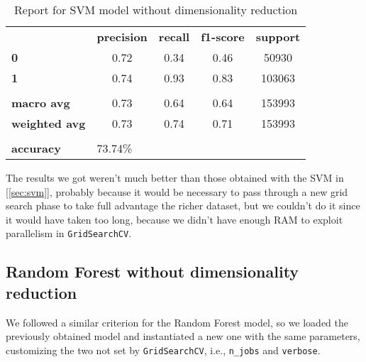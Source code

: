 \begin{table}[h!]
    \centering
    \begin{tabular}{lcccc}
        \rowcolor[HTML]{EEEEEE} 
        \cellcolor[HTML]{FBFBFB} & \textbf{precision} & \textbf{recall} & \textbf{f1-score} & \textbf{support} \\
        \rowcolor[HTML]{EEEEEE} 
        \textbf{0}               & 0.72               & 0.34            & 0.46              & 50930            \\
        \rowcolor[HTML]{EEEEEE} 
        \textbf{1}               & 0.74               & 0.93            & 0.83              & 103063           \\
        \rowcolor[HTML]{FBFBFB} 
        &                    &                 &                   &                  \\
        \rowcolor[HTML]{EEEEEE} 
        \textbf{macro avg}       & 0.73               & 0.64            & 0.64              & 153993           \\
        \rowcolor[HTML]{EEEEEE} 
        \textbf{weighted avg}    & 0.73               & 0.74            & 0.71              & 153993           \\
        \rowcolor[HTML]{FBFBFB} 
        &                    &                 &                   &                  \\
        \rowcolor[HTML]{EEEEEE} 
        \textbf{accuracy}        & \multicolumn{4}{l}{\cellcolor[HTML]{EEEEEE}73.74\%}                         
    \end{tabular}
    \caption{Report for SVM model without dimensionality reduction}
    \label{tab:svm-res-no-dim-red}
\end{table}

The results we got weren't much better than those obtained with the SVM in [\ref{sec:svm}], probably because it would be necessary to pass through a new grid search phase to take full advantage the richer dataset, but we couldn't do it since it would have taken too long, because we didn't have enough RAM to exploit parallelism in \texttt{GridSearchCV}.


\newpage
\subsection{Random Forest without dimensionality reduction} \label{sec:rf-no-dim-red}

We followed a similar criterion for the Random Forest model, so we loaded the previously obtained model and instantiated a new one with the same parameters, customizing the two not set by \texttt{GridSearchCV}, i.e., \texttt{n\_jobs} and \texttt{verbose}.

